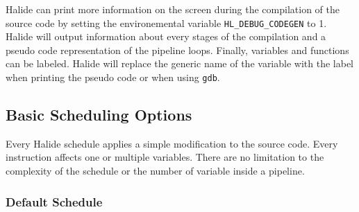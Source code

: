 	Halide can print more information on the screen during the compilation of the source code by setting the environemental variable \verb|HL_DEBUG_CODEGEN| to 1. Halide will output information about every stages of the compilation and a pseudo code representation of the pipeline loops. 
	Finally, variables and functions can be labeled. Halide will replace the generic name of the variable with the label when printing the pseudo code or when using \texttt{gdb}.

\subsection {Basic Scheduling Options}
	\label{section:scheduling}
	Every Halide schedule applies a simple modification to the source code. Every instruction affects one or multiple variables. There are no limitation to the complexity of the schedule or the number of variable inside a pipeline.

\newcommand\EIW{.4\textwidth}
\newcommand\ECW{\textwidth - \EIW}

	\subsubsection{Default Schedule}


